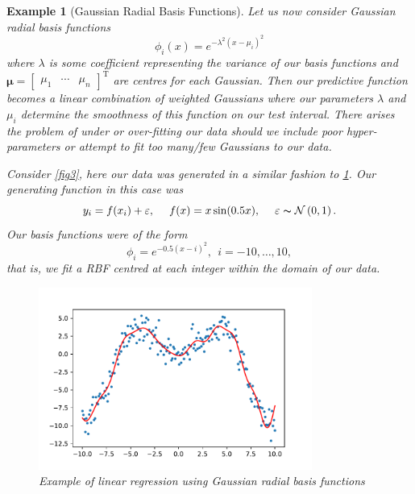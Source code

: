 \documentclass[10pt,a4paper]{article}
\numberwithin{equation}{section}
\theoremstyle{plain}
\theoremstyle{own}
\newtheorem{example}{Example}[section]
\begin{document}
\begin{example}[Gaussian Radial Basis Functions]
Let us now consider Gaussian radial basis functions
\begin{equation}
\phi_i(x) = e^{-\lambda^{2} ( x - \mu_i ) ^{2} }
\end{equation}
where $\lambda$ is some coefficient representing the variance of our basis functions and $\boldsymbol\mu = \left[ \begin{matrix} \mu_1 & \cdots & \mu_n \end{matrix} \right]^{\text{T}}$ are centres for each Gaussian. Then our predictive function becomes a linear combination of weighted Gaussians where our parameters $\lambda$ and $\mu_i$ determine the smoothness of this function on our test interval. There arises the problem of under or over-fitting our data should we include poor hyper-parameters or attempt to fit too many/few Gaussians to our data.

Consider \cref{fig3}, here our data was generated in a similar fashion to \cref{rbf}. Our generating function in this case was
\begin{equation}
y_i = f(x_i) + \varepsilon, ~~~~ f(x) = x \sin(0.5x), ~~~~ \varepsilon \thicksim \mathcal{N} \left( 0, 1 \right).
\end{equation}
Our basis functions were of the form
\begin{equation}
\phi_i = e^{-0.5 ( x - i ) ^{2} },~~ i = -10, \ldots, 10,
\end{equation}
that is, we fit a RBF centred at each integer within the domain of our data.
\begin{figure}[H]
\centering
\includegraphics[width = 0.8\textwidth]{f5}
\caption{Example of linear regression using Gaussian radial basis functions}
\label{rbf}
\end{figure}
\end{example}

\pagebreak 
\begin{bibdiv}
\begin{biblist}
\end{biblist}
\end{bibdiv}
\end{document}
